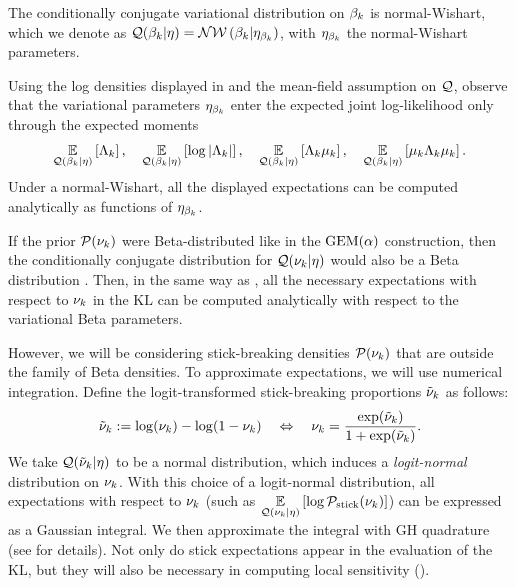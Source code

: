 \begin{ex}
%
The conditionally conjugate variational distribution on $\beta_k$ is
normal-Wishart, which we denote as
$\mathcal{Q}(\beta_k \vert \eta) = \mathcal{N}\mathcal{W}\left(\beta_k \vert \eta_{\beta_k}\right)$,
with $\eta_{\beta_k}$ the normal-Wishart parameters.

Using the log densities displayed in 
and the mean-field assumption on $\mathcal{Q}$,
observe that the variational parameters $\eta_{\beta_k}$
enter the expected joint log-likelihood only through the
expected moments
%
\begin{align*}
\underset{\mathcal{Q}(\beta_k \vert \eta)}{\mathbb{E}}\left[\Lambda_k\right],  \quad
\underset{\mathcal{Q}(\beta_k \vert \eta)}{\mathbb{E}}\left[\log|\Lambda_k|\right],  \quad
\underset{\mathcal{Q}(\beta_k \vert \eta)}{\mathbb{E}}\left[\Lambda_k\mu_k\right], \quad
\underset{\mathcal{Q}(\beta_k \vert \eta)}{\mathbb{E}}\left[\mu_k\Lambda_k\mu_k\right].
\end{align*}
Under a normal-Wishart, all the displayed expectations
can be computed analytically as functions of $\eta_{\beta_k}$.
%
\end{ex}

If the prior $\mathcal{P}(\nu_{k})$ were Beta-distributed like in the $\mathrm{GEM}(\alpha)$
construction, then the conditionally conjugate distribution for $\mathcal{Q}(\nu_{k} \vert
\eta)$ would also be a Beta distribution \citep{blei:2006:vi_for_dp}. Then, in
the same way as , all the necessary expectations with
respect to $\nu_{k}$ in the $\mathrm{KL}$ can be computed analytically with respect
to the variational Beta parameters.

However, we will be considering stick-breaking densities $\mathcal{P}(\nu_{k})$
that are outside the family of Beta densities. To approximate expectations,
we will use numerical integration.  Define the logit-transformed stick-breaking
proportions $\tilde{\nu}_{k}$ as follows:
%
\begin{align*}
  \tilde{\nu}_k := \log(\nu_k) - \log(1 - \nu_k)
  \quad \Leftrightarrow \quad
  \nu_{k} = \frac{\exp(\tilde{\nu}_k)}{1 + \exp(\tilde{\nu}_k)}.
\end{align*}
%
We take $\mathcal{Q}(\tilde{\nu}_{k} \vert \eta)$ to be a normal distribution, which induces a
\textit{logit-normal} distribution on $\nu_{k}$. With this choice of a logit-normal
distribution, all expectations with respect to $\nu_k$ (such as
$\underset{\mathcal{Q}(\nu_k\vert\eta)}{\mathbb{E}}\left[\log \mathcal{P}_{\mathrm{stick}}(\nu_k)\right]$) can be expressed as a
Gaussian integral. We then approximate the integral with GH quadrature (see
 for details). Not only do stick expectations appear in
the evaluation of the $\mathrm{KL}$, but they will also be necessary in
computing local sensitivity ().

